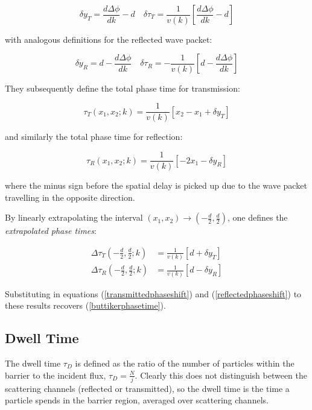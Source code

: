 \documentclass{article}
\begin{document}
\begin{equation}
	\delta y_T = \frac{d\Delta\phi}{dk}-d \quad \delta\tau_T=\frac{1}{v(k)} \left[\frac{d\Delta\phi}{dk}-d\right]
	\label{transmittedphaseshift}
\end{equation}

\noindent with analogous definitions for the reflected wave packet:

\begin{equation}
	\delta y_R = d-\frac{d\Delta\phi}{dk} \quad \delta\tau_R=-\frac{1}{v(k)} \left[d-\frac{d\Delta\phi}{dk}\right]
	\label{reflectedphaseshift}
\end{equation}

\noindent They subsequently define the total phase time for transmission:

\begin{equation}
	\tau_T(x_1,x_2;k) = \frac{1}{v(k)}[x_2-x_1+\delta y_T]
\end{equation}

\noindent and similarly the total phase time for reflection:

\begin{equation}
	\tau_R(x_1,x_2;k) = \frac{1}{v(k)}[-2x_1-\delta y_R]
\end{equation}

\noindent where the minus sign before the spatial delay is picked up due to the wave packet travelling in the opposite direction.

\noindent By linearly extrapolating the interval $(x_1,x_2) \rightarrow (-\frac{d}{2},\frac{d}{2})$, one defines the \textit{extrapolated phase times}:

\begin{align}
	\Delta\tau_T(-\frac{d}{2},\frac{d}{2};k) &= \frac{1}{v(k)}[d+\delta y_T] \\
	\Delta\tau_R(-\frac{d}{2},\frac{d}{2};k) &= \frac{1}{v(k)}[d-\delta y_R]
\end{align}

\noindent Substituting in equations (\ref{transmittedphaseshift}) and (\ref{reflectedphaseshift}) to these results recovers (\ref{buttikerphasetime}).

\subsection{Dwell Time}

The dwell time $\tau_D$ is defined as the ratio of the number of particles within the barrier to the incident flux, $\tau_D = \frac{N}{j}$. Clearly this does not distinguish between the scattering channels (reflected or transmitted), so the dwell time is the time a particle spends in the barrier region, averaged over scattering channels.
\end{document}

